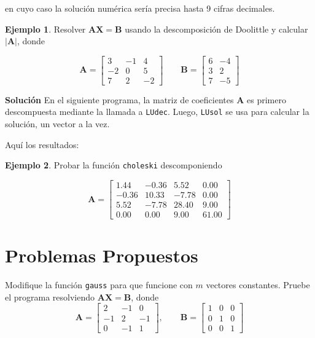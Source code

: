 \documentclass[12pt,letterpaper]{article}
\theoremstyle{definition}
\newtheorem{ejemplo}{Ejemplo}[section]
\theoremstyle{plain}
\theoremstyle{remark}
\begin{document}
en cuyo caso la solución numérica sería precisa hasta 9 cifras decimales.

\begin{ejemplo}
Resolver $\mathbf{AX} = \mathbf{B}$ usando la descomposición de Doolittle y calcular $|\mathbf{A}|$, donde

\[
\mathbf{A} =
\begin{bmatrix}
3 & -1 & 4 \\
-2 & 0 & 5 \\
7 & 2 & -2
\end{bmatrix}
\qquad
\mathbf{B} =
\begin{bmatrix}
6 & -4 \\
3 & 2 \\
7 & -5
\end{bmatrix}
\]
\end{ejemplo}

\textbf{Solución} \quad En el siguiente programa, la matriz de coeficientes $\mathbf{A}$ es primero descompuesta mediante la llamada a \texttt{LUdec}. Luego, \texttt{LUsol} se usa para calcular la solución, un vector a la vez.



Aquí los resultados:



\begin{ejemplo}
Probar la función \texttt{choleski} descomponiendo

\[
\mathbf{A} =
\begin{bmatrix}
1.44 & -0.36 & 5.52 & 0.00 \\
-0.36 & 10.33 & -7.78 & 0.00 \\
5.52 & -7.78 & 28.40 & 9.00 \\
0.00 & 0.00 & 9.00 & 61.00
\end{bmatrix}
\]
\end{ejemplo}




\section{Problemas Propuestos}

{\problem Modifique la función \texttt{gauss} para que funcione con $m$ vectores constantes. Pruebe el programa resolviendo $\mathbf{AX} = \mathbf{B}$, donde
    \[
    \mathbf{A} = \begin{bmatrix}
    2 & -1 & 0 \\
    -1 & 2 & -1 \\
    0 & -1 & 1
    \end{bmatrix}, \qquad
    \mathbf{B} = \begin{bmatrix}
    1 & 0 & 0 \\
    0 & 1 & 0 \\
    0 & 0 & 1
    \end{bmatrix}
    \]}
    
\end{document}
